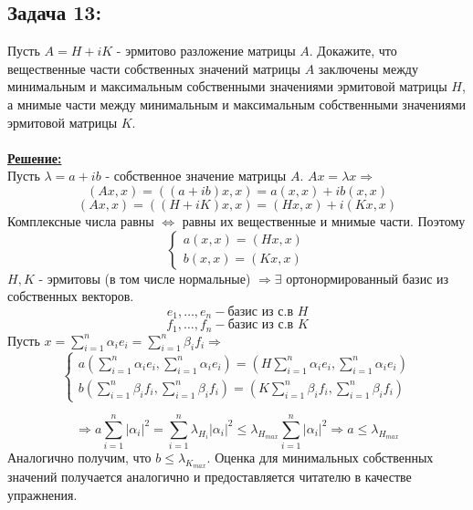 \documentclass[a4paper,12pt,titlepage,final]{article}
\begin{document}
\subsection*{Задача 13:}
\noindent Пусть $A = H + iK$ - эрмитово разложение матрицы $A$. Докажите, что вещественные части собственных значений матрицы $A$ заключены между минимальным и максимальным собственными значениями эрмитовой матрицы $H$, а мнимые части
между минимальным и максимальным собственными значениями эрмитовой матрицы $K$.\\ \\
\textbf{\underline{Решение:}} \\
Пусть $\lambda = a + ib$ - собственное значение матрицы $A$. $Ax = \lambda x \Rightarrow$
$$(Ax, x) = ((a + ib)x, x) = a(x, x) + ib(x, x)$$
$$(Ax, x) = ((H + iK)x, x) = (Hx, x) + i(Kx, x)$$
Комплексные числа равны $\Leftrightarrow$ равны их вещественные и мнимые части. Поэтому
\begin{equation*}
\left\{ \begin{aligned}
a(x, x) = (Hx, x) \\
b(x, x) = (Kx, x)
\end{aligned} \right. 
\end{equation*}
$H, K$ - эрмитовы (в том числе нормальные) $\Rightarrow \exists$ ортонормированный базис из собственных векторов.
$$e_1, \ldots, e_n - \text{базис из с.в } H$$
$$f_1, \ldots, f_n - \text{базис из с.в } K$$
Пусть $x = \sum_{i=1}^n\alpha_ie_i = \sum_{i=1}^n\beta_if_i \Rightarrow$
\begin{equation*}
\left\{ \begin{aligned}
a(\sum_{i=1}^n\alpha_ie_i , \sum_{i=1}^n\alpha_ie_i ) = (H\sum_{i=1}^n\alpha_ie_i , \sum_{i=1}^n\alpha_ie_i ) \\
b(\sum_{i=1}^n\beta_if_i, \sum_{i=1}^n\beta_if_i) = (K\sum_{i=1}^n\beta_if_i, \sum_{i=1}^n\beta_if_i)
\end{aligned} \right. 
\end{equation*}

$$\Rightarrow a\sum_{i=1}^n|\alpha_i|^2 = \sum_{i=1}^n\lambda_{H_i}|\alpha_i|^2 \leq  \lambda_{H_{max}}\sum_{i=1}^n|\alpha_i|^2 \Rightarrow a \leq \lambda_{H_{max}}$$
Аналогично получим, что $b \leq \lambda_{K_{max}}$. Оценка для минимальных собственных значений получается аналогично и предоставляется читателю в качестве упражнения. \blacksquare \\ \\ \\
\end{document}
